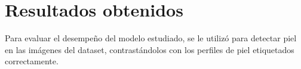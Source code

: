 \documentclass[12pt]{article}
\begin{document}
\begin{comment}
Una forma de modelar las distribuciones de probabilidad  $\mathbb{P} [ rgb|skin
]$ y $\mathbb{P} [ rgb | \neg skin ]$ es mediante una suma de funciones
gaussianas:

\begin{equation}
    \mathbb{P}[\mathbf{x}] = \sum\limits_{i=1}^N w_i
    \frac{1}{(2\pi)^{\frac{3}{2}} | \Sigma_i |^\frac{1}{2}} e^{-\frac{1}{2}
    (\mathbf{x} - \mathbf{\mu}_i)^{\text{T}} \Sigma_i ^{-1} (\mathbf{x} -
    \mathbf{\mu}_i)},
\end{equation} 

donde los valores $\mu_i$ y $\Sigma_i$ son las medias de cada gaussiana y las
correspondientes matrices (diagonales) de covarianza. Los valores $w_i$
determinan el peso que cada gaussiana ejerce en la mezcla. $N$ define la
complejidad del modelo, (ya que un mayor valor de $N$ resulta en más gaussianas
y por tanto un mayor número de grados de libertad) siendo un parámetro a
elección. 

Los autores de \cite{skin} entrenaron modelos para estimar ambas
distribuciones de probabilidad descritas, con lo que estos parámetros tienen
valores dados. Así, el trabajo se enfocó en variar el umbral de detección,
$\Theta$.

\subsection{Dataset utilizado}

Se construyó un pequeño \emph{dataset} compuesto por imágenes de dos tipos. Por
un lado, se recopilaron 14 imágenes buscando incorporar variaciones en
iluminación, tonos de piel y el nivel de detalle del fondo. Otras 16 imágenes
fueron tomadas del dataset utilizado en \cite{dataset} (junto con las
correspondientes \emph{ground truths}). Para cada imagen del
dataset generado, se obtuvo una imagen que identifica las zonas que son piel,
generándose así la \emph{ground truth} contra la que se comparó el rendimiento
del modelo estadístico. Cada imagen del dataset incluye al menos a una persona,
de modo que siempre se tiene piel por detectar.

\end{comment}

\section{Resultados obtenidos}

Para evaluar el desempeño del modelo estudiado, se le utilizó para detectar piel
en las imágenes del dataset, contrastándolos con los perfiles de piel
etiquetados correctamente. 
\end{document}
